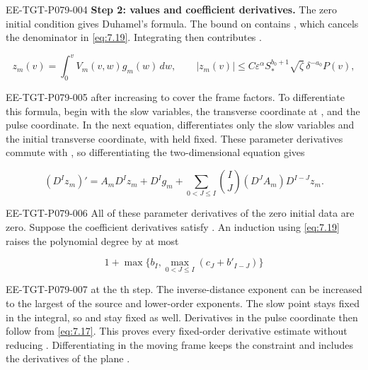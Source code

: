 \begin{EESegment}{EE-TGT-P079-004}
\textbf{Step 2: values and coefficient derivatives.}
The zero initial condition gives Duhamel's formula. The bound on  contains , which cancels the denominator in \eqref{eq:7.19}. Integrating then contributes .
\end{EESegment}
\[
  z_m(v)=\int_0^v V_m(v,w)g_m(w)\,dw,
  \qquad
  |z_m(v)|\leq C\varepsilon^\alpha S_*^{b_0+1}\sqrt{\zeta}\,\delta^{-a_0}P(v),
\]
\begin{EESegment}{EE-TGT-P079-005}
after increasing  to cover the frame factors. To differentiate this formula, begin with the slow variables, the transverse coordinate at , and the pulse coordinate. In the next equation,  differentiates only the slow variables and the initial transverse coordinate, with  held fixed. These parameter derivatives commute with , so differentiating the two-dimensional equation gives
\end{EESegment}
\begin{equation}
  (D^I z_m)'=A_mD^Iz_m+D^Ig_m+
  \sum_{0<J\leq I}\binom{I}{J}(D^JA_m)D^{I-J}z_m.
  \tag{7.20}\label{eq:7.20}
\end{equation}
\begin{EESegment}{EE-TGT-P079-006}
All of these parameter derivatives of the zero initial data are zero. Suppose the coefficient derivatives satisfy . An induction using \eqref{eq:7.19} raises the polynomial degree by at most
\end{EESegment}
\[
  1+\max\{b_I,\max_{0<J\leq I}(c_J+b'_{I-J})\}
\]
\begin{EESegment}{EE-TGT-P079-007}
at the th step. The inverse-distance exponent can be increased to the largest of the source and lower-order exponents. The slow point stays fixed in the integral, so  and  stay fixed as well. Derivatives in the pulse coordinate then follow from \eqref{eq:7.17}. This proves every fixed-order derivative estimate without reducing . Differentiating in the moving frame keeps the constraint  and includes the derivatives of the plane .
\end{EESegment}

